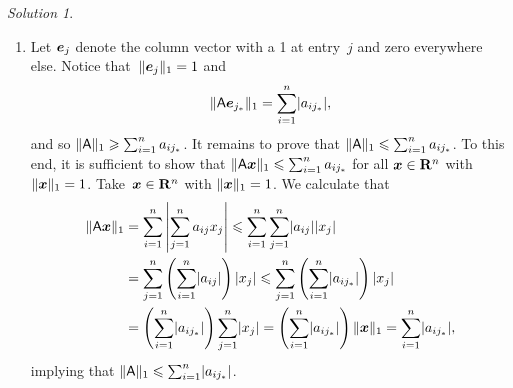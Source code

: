 \documentclass[11pt]{article}
\theoremstyle{definition}
\theoremstyle{remark}
\newtheorem*{protosolution}{Solution}
\newenvironment{solutionframe}
{%
    \begin{mdframed}[
        leftmargin=1cm,
        skipabove=.3cm,
        linecolor=blue,
        backgroundcolor=lightgreen,
        linewidth=0pt,
        innerleftmargin=.5em,
        innerrightmargin=.5em,
        innertopmargin=.3em,
        innerbottommargin=.6em,
    ]
}
{
    \end{mdframed}
}
\newenvironment{solution}
{\pushQED{\qed}\renewcommand{\qedsymbol}{$\triangle$}
\begin{solutionframe}\small \begin{protosolution}}
{\popQED\end{protosolution}\end{solutionframe}}
\begin{document}
\begin{solution}
    $~$
    \begin{enumerate}
        \item
            Let $\mathbf{\boldsymbol{e}}_j$ denote the column vector with a 1 at entry~$j$ and zero everywhere else.
            Notice that~$\lVert \mathbf{\boldsymbol{e}}_j \rVert_1 = 1$ and
            \[
                \lVert\mathsf A \mathbf{\boldsymbol{e}}_{j_*}\rVert_1 = \sum_{i=1}^{n} \lvert a_{ij_*} \rvert,
            \]
            and so $\lVert\mathsf A\rVert_1 \geqslant \sum_{i=1}^{n} a_{ij_*}$.
            It remains to prove that $\lVert\mathsf A\rVert_1 \leqslant \sum_{i=1}^{n} a_{ij_*}$.
            To this end,
            it is sufficient to show that $\lVert\mathsf A \mathbf{\boldsymbol{x}}\rVert_1 \leqslant \sum_{i=1}^{n} a_{ij_*}$ for all $\mathbf{\boldsymbol{x}} \in \mathbf R^n$ with $\lVert\mathbf{\boldsymbol{x}}\rVert_1 = 1$.
            Take~$\mathbf{\boldsymbol{x}} \in \mathbf R^n$ with $\lVert\mathbf{\boldsymbol{x}}\rVert_1 = 1$.
            We calculate that
            \begin{align*}
                \lVert\mathsf A \mathbf{\boldsymbol{x}}\rVert_1
                &= \sum_{i=1}^{n} \left\lvert \sum_{j=1}^{n} a_{ij} x_j \right\rvert
                \leqslant \sum_{i=1}^{n} \sum_{j=1}^{n} \lvert a_{ij} \rvert \lvert x_j \rvert  \\
                &=  \sum_{j=1}^{n} \left(\sum_{i=1}^{n} \lvert a_{ij} \rvert\right) \lvert x_j \rvert
                \leqslant \sum_{j=1}^{n} \left(\sum_{i=1}^{n} \lvert a_{ij_*} \rvert\right) \lvert x_j \rvert  \\
                &= \left(\sum_{i=1}^{n} \lvert a_{ij_*} \rvert\right) \sum_{j=1}^{n} \lvert x_j \rvert
                = \left(\sum_{i=1}^{n} \lvert a_{ij_*} \rvert\right) \lVert\mathbf{\boldsymbol{x}}\rVert_1 = \sum_{i=1}^{n}\lvert a_{ij_*} \rvert,
            \end{align*}
            implying that $\lVert\mathsf A\rVert_1 \leqslant \sum_{i=1}^{n}\lvert a_{ij_*} \rvert$.


\end{enumerate}
\end{solution}
\end{document}

